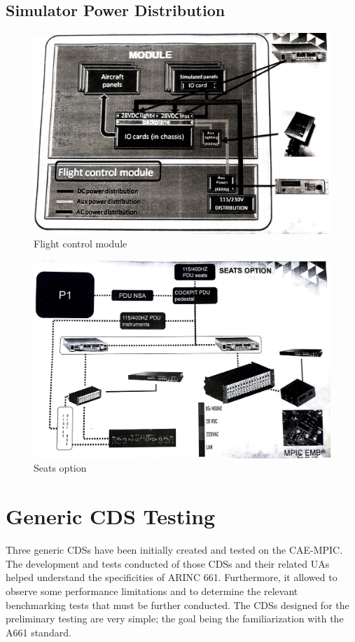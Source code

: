     \subsection{Simulator Power Distribution}
        \begin{figure}[H]
            \centering
            \includegraphics[width=0.6\linewidth]{img/flight-control.png}
            \caption{Flight control module}
        \end{figure}
        \begin{figure}[H]
            \centering
            \includegraphics[width=0.6\linewidth]{img/seat-option.png}
            \caption{Seats option}
        \end{figure}
    

\section{Generic CDS Testing}
    Three generic CDSs have been initially created and tested on the CAE-MPIC. The development and tests conducted of those 
    CDSs and their related UAs helped understand the specificities of ARINC 661. Furthermore, it allowed to observe some 
    performance limitations and to determine the relevant benchmarking tests that must be further conducted. The CDSs designed 
    for the preliminary testing are very simple; the goal being the familiarization with the A661 standard.
